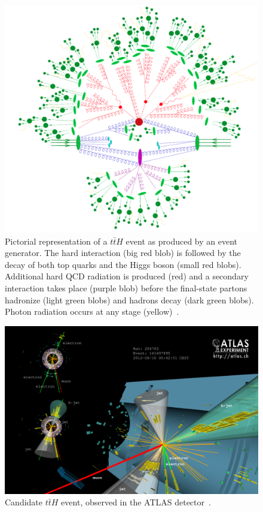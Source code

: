 \begin{figure}[p]
  \centering
  \includegraphics[width=\textwidth, clip=true, trim=0 0 0 0]
  {figs/mc_gen/full_mc_event.png}
  \caption[
    Pictorial representation of a $t\bar{t}H$ event as produced by an event
    generator~\cite{Gleisberg:2008ta}.
  ]{
    Pictorial representation of a $t\bar{t}H$ event as produced by an event
    generator.
    The hard interaction (big red blob) is followed by the decay of both top
    quarks and the Higgs boson (small red blobs).
    Additional hard QCD radiation is produced (red) and a secondary
    interaction takes place (purple blob) before the final-state partons
    hadronize (light green blobs) and hadrons decay (dark green blobs).
    Photon radiation occurs at any stage (yellow)~\cite{Gleisberg:2008ta}.
  }
  \label{fig:mc_event}
\end{figure}

\begin{figure}[ht]
  \centering
  \includegraphics[width=\textwidth, clip=true, trim=0 0 0 0]
  {figs/mc_gen/tth_event.png}
  \caption{
    Candidate $t\bar{t}H$ event, observed in the ATLAS
    detector~\cite{Aad:2015iha}.
  }
  \label{fig:data_event}
\end{figure}

